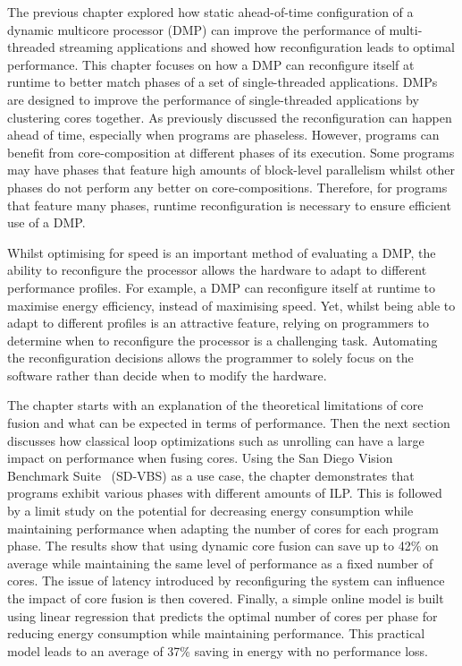 The previous chapter explored how static ahead-of-time configuration of a dynamic multicore processor (DMP) can improve the performance of multi-threaded streaming applications and showed how reconfiguration leads to optimal performance.
This chapter focuses on how a DMP can reconfigure itself at runtime to better match phases of a set of single-threaded applications.
DMPs are designed to improve the performance of single-threaded applications by clustering cores together.
As previously discussed the reconfiguration can happen ahead of time, especially when programs are phaseless.
However, programs can benefit from core-composition at different phases of its execution.
Some programs may have phases that feature high amounts of block-level parallelism whilst other phases do not perform any better on core-compositions.
Therefore, for programs that feature many phases, runtime reconfiguration is necessary to ensure efficient use of a DMP.

Whilst optimising for speed is an important method of evaluating a DMP, the ability to reconfigure the processor allows the hardware to adapt to different performance profiles.
For example, a DMP can reconfigure itself at runtime to maximise energy efficiency, instead of maximising speed.
Yet, whilst being able to adapt to different profiles is an attractive feature, relying on programmers to determine when to reconfigure the processor is a challenging task.
Automating the reconfiguration decisions allows the programmer to solely focus on the software rather than decide when to modify the hardware.

The chapter starts with an explanation of the theoretical limitations of core fusion and what can be expected in terms of performance.
Then the next section discusses how classical loop optimizations such as unrolling can have a large impact on performance when fusing cores.
Using the San Diego Vision Benchmark Suite~\cite{sdvbs} (SD-VBS) as a use case, the chapter demonstrates that programs exhibit various phases with different amounts of ILP.
This is followed by a limit study on the potential for decreasing energy consumption while maintaining performance when adapting the number of cores for each program phase.
The results show that using dynamic core fusion can save up to 42\% on average while maintaining the same level of performance as a fixed number of cores.
The issue of latency introduced by reconfiguring the system can influence the impact of core fusion is then covered.
Finally, a simple online model is built using linear regression that predicts the optimal number of cores per phase for reducing energy consumption while maintaining performance.
This practical model leads to an average of 37\% saving in energy with no performance loss.

